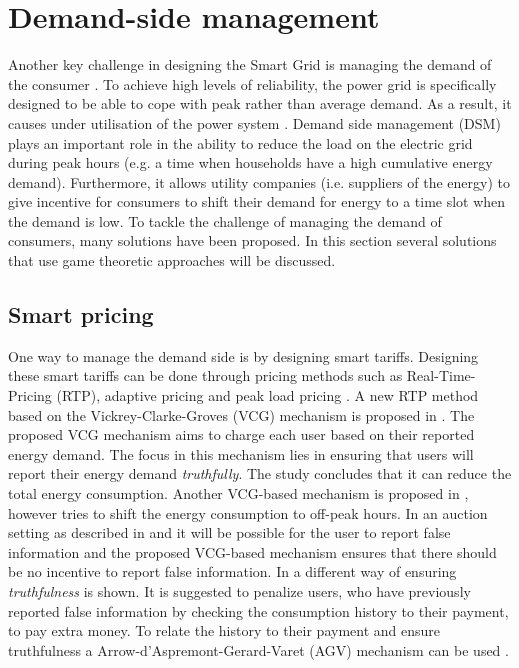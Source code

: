 \section{Demand-side management}
Another key challenge in designing the Smart Grid is managing the demand of the consumer \cite{keypaper}. To achieve high levels of reliability, the power grid is specifically designed to be able to cope with peak rather than average demand. As a result, it causes under utilisation of the power system \cite{MaDengSongEtAl2014}. Demand side management (DSM) plays an important role in the ability to reduce the load on the electric grid during peak hours (e.g. a time when households have a high cumulative energy demand). Furthermore, it allows utility companies (i.e. suppliers of the energy) to give incentive for consumers to shift their demand for energy to a time slot when the demand is low. To tackle the challenge of managing the demand of consumers, many solutions have been proposed. In this section several solutions that use game theoretic approaches will be discussed. 

\subsection{Smart pricing}
One way to manage the demand side is by designing smart tariffs. Designing these smart tariffs can be done through pricing methods such as Real-Time-Pricing (RTP), adaptive pricing and peak load pricing \cite{SamadiMohsenian-RadSchoberEtAl2012}. A new RTP method based on the Vickrey-Clarke-Groves (VCG) mechanism is proposed in \cite{SamadiMohsenian-RadSchoberEtAl2012}. The proposed VCG mechanism aims to charge each user based on their reported energy demand. The focus in this mechanism lies in ensuring that users will report their energy demand \textit{truthfully}. The study concludes that it can reduce the total energy consumption. Another VCG-based mechanism is proposed in \cite{SamadiSchoberWong2011}, however tries to shift the energy consumption to off-peak hours. In an auction setting as described in \cite{SamadiMohsenian-RadSchoberEtAl2012} and \cite{SamadiSchoberWong2011} it will be possible for the user to report false information and the proposed VCG-based mechanism ensures that there should be no incentive to report false information. In \cite{MaDengSongEtAl2014} a different way of ensuring \textit{truthfulness} is shown. It is suggested to penalize users, who have previously reported false information by checking the consumption history to their payment, to pay extra money. To relate the history to their payment and ensure truthfulness a Arrow-d'Aspremont-Gerard-Varet (AGV) mechanism can be used \cite{MaDengSongEtAl2014}.

